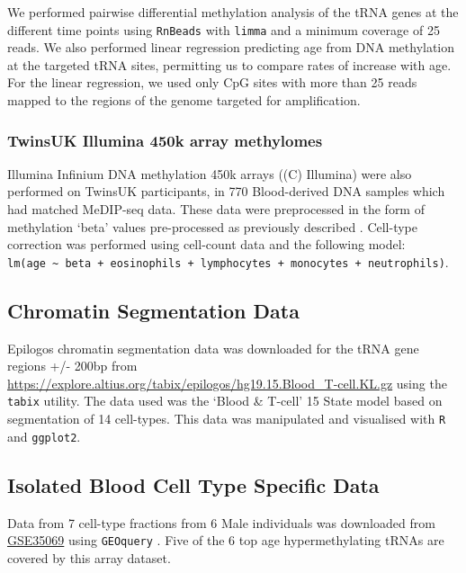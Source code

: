 \documentclass[]{book}
\begin{document}
We performed pairwise differential methylation analysis of the tRNA genes at the different time points using \texttt{RnBeads} \citep{Muller2019} with \texttt{limma} \citep{Ritchie2015} and a minimum coverage of 25 reads.
We also performed linear regression predicting age from DNA methylation at the targeted tRNA sites, permitting us to compare rates of increase with age.
For the linear regression, we used only CpG sites with more than 25 reads mapped to the regions of the genome targeted for amplification.

\hypertarget{twinsuk-illumina-450k-array-methylomes}{%
\subsubsection{TwinsUK Illumina 450k array methylomes}\label{twinsuk-illumina-450k-array-methylomes}}

Illumina Infinium DNA methylation 450k arrays ((C) Illumina) were also performed on TwinsUK participants, in 770 Blood-derived DNA samples which had matched MeDIP-seq data.
These data were preprocessed in the form of methylation `beta' values pre-processed as previously described \citep{Bell2016, Bell2017a}.
Cell-type correction was performed using cell-count data and the following model: \texttt{lm(age\ \textasciitilde{}\ beta\ +\ eosinophils\ +\ lymphocytes\ +\ monocytes\ +\ neutrophils)}.

\hypertarget{chromatin-segmentation-data}{%
\subsection{Chromatin Segmentation Data}\label{chromatin-segmentation-data}}

Epilogos chromatin segmentation data \citep{Meuleman2019} was downloaded for the tRNA gene regions +/- 200bp from \url{https://explore.altius.org/tabix/epilogos/hg19.15.Blood_T-cell.KL.gz} using the \texttt{tabix} utility.
The data used was the `Blood \& T-cell' 15 State model based on segmentation of 14 cell-types.
This data was manipulated and visualised with \texttt{R} and \texttt{ggplot2}.

\hypertarget{sortedbloodmethods}{%
\subsection{Isolated Blood Cell Type Specific Data}\label{sortedbloodmethods}}

Data from 7 cell-type fractions from 6 Male individuals was downloaded from \href{https://www.ncbi.nlm.nih.gov/geo/query/acc.cgi?acc=GSE35069}{GSE35069} \citep{Reinius2012} using \texttt{GEOquery} \citep{Davis2007p}.
Five of the 6 top age hypermethylating tRNAs are covered by this array dataset.
\end{document}
